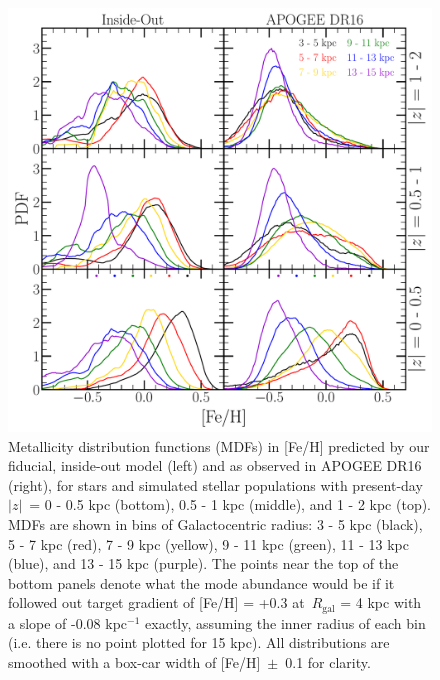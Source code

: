\begin{figure} 
\centering 
\includegraphics[scale = 0.45]{mdf_3panel_fe.pdf} 
\caption{Metallicity distribution functions (MDFs) in [Fe/H] predicted by our 
fiducial, inside-out model (left) and as observed in APOGEE DR16 (right), for 
stars and simulated stellar populations with present-day~$\left|z\right|$~= 0 - 
0.5 kpc (bottom), 0.5 - 1 kpc (middle), and 1 - 2 kpc (top). MDFs are shown in 
bins of Galactocentric radius: 3 - 5 kpc (black), 5 - 7 kpc (red), 7 - 9 kpc 
(yellow), 9 - 11 kpc (green), 11 - 13 kpc (blue), and 13 - 15 kpc (purple). 
The points near the top of the bottom panels denote what the mode abundance 
would be if it followed out target gradient of [Fe/H] = +0.3 at~$R_\text{gal}$ 
= 4 kpc with a slope of -0.08 kpc$^{-1}$ exactly, assuming the inner radius of 
each bin (i.e. there is no point plotted for 15 kpc). All distributions are 
smoothed with a box-car width of [Fe/H]~$\pm$~0.1 for clarity. } 
\label{migration:fig:mdf_3panel_fe} 
\end{figure} 

